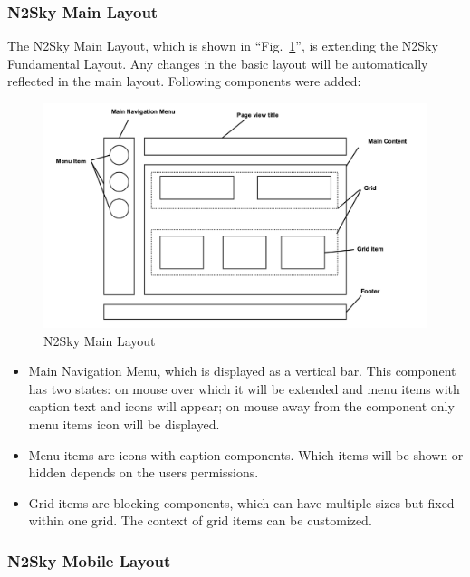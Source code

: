 \subsubsection{N2Sky Main Layout}\label{N2Sky Main Layout}

The N2Sky Main Layout, which is shown in ``Fig.~\ref{fig:layout_main}'',  is extending the N2Sky Fundamental Layout. Any changes in the basic layout will be automatically reflected in the main layout. Following components were added:

\begin{figure}[H]
\begin{center}
  \includegraphics[width=\linewidth]{components/3/components/layout_main.png}
  \caption{N2Sky Main Layout}
  \label{fig:layout_main}
\end{center}
\end{figure}

\begin{itemize}
\item Main Navigation Menu, which is displayed as a vertical bar. This component has two states: on mouse over which it will be extended and menu items with caption text and icons will appear; on mouse away from the component only menu items icon will be displayed. 
\item Menu items are icons with caption components. Which items will be shown or hidden depends on the users permissions.
\item Grid items are blocking components, which can have multiple sizes but fixed within one grid. The context of grid items can be customized. 
\end{itemize}



\subsubsection{N2Sky Mobile Layout}\label{N2Sky Mobile Layout}

